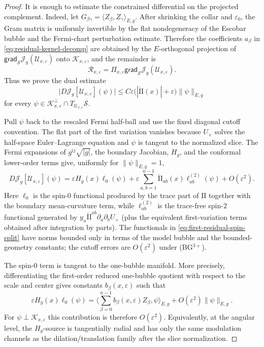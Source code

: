 \documentclass[11pt,reqno,a4paper]{amsart}
\numberwithin{equation}{section}
\theoremstyle{plain}
\theoremstyle{remark}
\theoremstyle{plain}
\begin{document}
\begin{proof}
It is enough to estimate the constrained differential on the projected complement.  Indeed,
let $G_{\beta\gamma}=\langle Z_\beta,Z_\gamma\rangle_{E,g}$.  After shrinking the collar and
$\varepsilon_0$, the Gram matrix is uniformly invertible by the flat nondegeneracy of the
Escobar bubble and the Fermi-chart perturbation estimate.  Therefore the coefficients
$a_\beta$ in \eqref{eq:residual-kernel-decomp} are obtained by the $E$-orthogonal projection of
$\mathsf{grad}_{\mathcal S}\mathcal J_g(\mathcal U_{x,\varepsilon})$ onto
$\mathcal K_{x,\varepsilon}$, and the remainder is
\[
\mathcal R_{x,\varepsilon}
=\Pi_{x,\varepsilon}\mathsf{grad}_{\mathcal S}\mathcal J_g(\mathcal U_{x,\varepsilon}).
\]
Thus we prove the dual estimate
\begin{equation}\label{eq:residual-dual-test}
\big|D\mathcal J_g[\mathcal U_{x,\varepsilon}](\psi)\big|
\le C\varepsilon\bigl(|\mathring{\mathrm{II}}(x)|+\varepsilon\bigr)\|\psi\|_{E,g}
\end{equation}
for every
$\psi\in\mathcal K_{x,\varepsilon}^{\perp}\cap T_{\mathcal U_{x,\varepsilon}}\mathcal S$.

Pull $\psi$ back to the rescaled Fermi half-ball and use the fixed diagonal cutoff convention.
The flat part of the first variation vanishes because $U_+$ solves the half-space
Euler--Lagrange equation and $\psi$ is tangent to the normalized slice.  The Fermi expansions
of $g^{ij}\sqrt{|g|}$, the boundary Jacobian, $H_g$, and the conformal lower-order terms give,
uniformly for $\|\psi\|_{E,g}=1$,
\begin{equation}\label{eq:first-residual-spin-split}
D\mathcal J_g[\mathcal U_{x,\varepsilon}](\psi)
=\varepsilon H_g(x)\ell_0(\psi)
+\varepsilon\sum_{a,b=1}^{n-1}\mathring{\mathrm{II}}_{ab}(x)\ell_{ab}^{(2)}(\psi)
+O(\varepsilon^2).
\end{equation}
Here $\ell_0$ is the spin-$0$ functional produced by the trace part of $\mathrm{II}$ together
with the boundary mean-curvature term, while $\ell_{ab}^{(2)}$ is the trace-free spin-$2$
functional generated by
$y_n\mathring{\mathrm{II}}^{ab}\partial_a\partial_bU_+$ (plus the equivalent first-variation
terms obtained after integration by parts).  The functionals in
\eqref{eq:first-residual-spin-split} have norms bounded only in terms of the model bubble and
the bounded-geometry constants; the cutoff errors are $O(\varepsilon^2)$ under
\textup{(BG$^{3+}$)}.

The spin-$0$ term is tangent to the one-bubble manifold.  More precisely, differentiating the
first-order reduced one-bubble quotient with respect to the scale and center gives constants
$b_\beta(x,\varepsilon)$ such that
\[
\varepsilon H_g(x)\ell_0(\psi)
=\Big\langle \sum_{\beta=0}^{n-1} b_\beta(x,\varepsilon)Z_\beta,
\psi\Big\rangle_{E,g}+O(\varepsilon^2)\|\psi\|_{E,g}.
\]
For $\psi\perp\mathcal K_{x,\varepsilon}$ this contribution is therefore $O(\varepsilon^2)$.
Equivalently, at the angular level, the $H_g$-source is tangentially radial and has only the
same modulation channels as the dilation/translation family after the slice normalization.


\end{proof}
\end{document}
